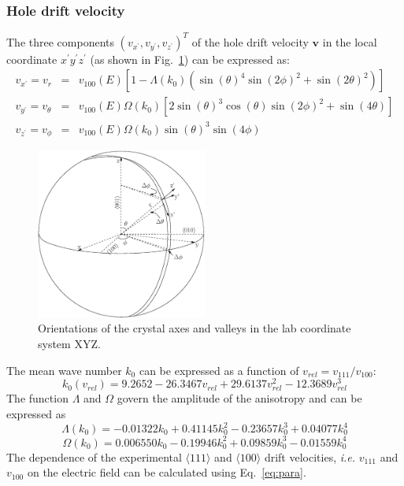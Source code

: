\subsubsection{Hole drift velocity}
\label{sec:hole}
The three components $(v_{x^{\prime}}, v_{y^{\prime}}, v_{z^{\prime}})^{T}$ of the hole drift velocity $\mathbf{v}$ in the local coordinate $x^{\prime}y^{\prime}z^{\prime}$ (as shown in Fig.~\ref{fig:vsphere}) can be expressed as:
\begin{equation}
  \label{eq:vsphere}
  \begin{array}{rcl}
   v_{x^{\prime}} = v_{r} &=& v_{100}(E)[1-\Lambda(k_{0})(\sin(\theta)^{4}\sin(2\phi)^{2} + \sin(2\theta)^{2})]\\
   v_{y^{\prime}} = v_{\theta} &=& v_{100}(E)\Omega(k_{0})[2\sin(\theta)^{3}\cos(\theta)\sin(2\phi)^{2} + \sin(4\theta)]\\
    v_{z^{\prime}} = v_{\phi} &=& v_{100}(E)\Omega(k_{0})\sin(\theta)^{3}\sin(4\phi)
  \end{array}
\end{equation}
\begin{figure}[tbhp]
  \centering
  \includegraphics[width=0.5\textwidth]{vsphere}  
  \caption{Orientations of the crystal axes and valleys in the lab
coordinate system XYZ.}
  \label{fig:vsphere}
\end{figure}
The mean wave number $k_{0}$ can be expressed as a function of $v_{rel} = v_{111}/v_{100}$:
\begin{equation}
  \label{eq:k0}
   k_{0}(v_{rel}) = 9.2652 - 26.3467v_{rel} + 29.6137v_{rel}^{2} - 12.3689v_{rel}^{3}
\end{equation}
The function $\Lambda$ and $\Omega$ govern the amplitude of the anisotropy and can be expressed as
\begin{equation}
  \label{eq:lamb}
   \Lambda(k_{0}) = -0.01322k_{0} + 0.41145k_{0}^{2} - 0.23657k_{0}^{3} + 0.04077k_{0}^{4}
\end{equation}
\begin{equation}
  \label{eq:ome}
   \Omega(k_{0}) = 0.006550k_{0} - 0.19946k_{0}^{2} + 0.09859k_{0}^{3} - 0.01559k_{0}^{4}
\end{equation}
The dependence of the experimental $\langle111\rangle$ and $\langle100\rangle$ drift velocities, \textit{i.e.} $v_{111}$ and $v_{100}$ on the electric field can be calculated using Eq.~\ref{eq:para}.


